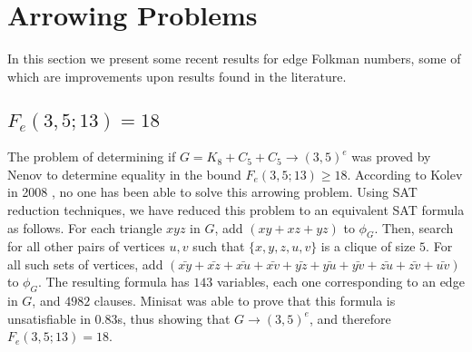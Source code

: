 \documentclass[paper=a4, fontsize=11pt]{scrartcl} %
\begin{document}
\section{Arrowing Problems}
In this section we present some recent results for edge Folkman numbers, some of which are improvements
upon results found in the literature.

\label{sec:arrowComputations}
\subsection{$F_e(3,5;13) = 18$}
The problem of determining if $G = K_8 + C_5 + C_5 \to (3,5)^e$ was proved by Nenov \cite{Nenov83-1}
to determine equality in the bound $F_e(3,5;13) \geq 18$. According to Kolev in 2008 \cite{Kolev08-2},
no one has been able to solve this arrowing problem. Using SAT reduction techniques, we have 
reduced this problem to an equivalent SAT formula as follows. For each triangle $xyz$ in $G$, add
$(xy + xz + yz)$ to $\phi_G$. Then, search for all other pairs of vertices $u,v$ such that $\{x,y,z,u,v\}$ is a clique
of size $5$. For all such sets of vertices, add $(\bar{xy} + \bar{xz} + \bar{xu} + \bar{xv} + \bar{yz} + \bar{yu} + \bar{yv} + \bar{zu} + \bar{zv} + \bar{uv})$
to $\phi_G$. The resulting formula has $143$ variables, each one corresponding to an edge in $G$,
and $4982$ clauses. Minisat was able to prove that this formula is unsatisfiable in 0.83s, thus
showing that $G \to (3,5)^e$, and therefore $F_e(3,5;13) = 18$.

\end{document}
